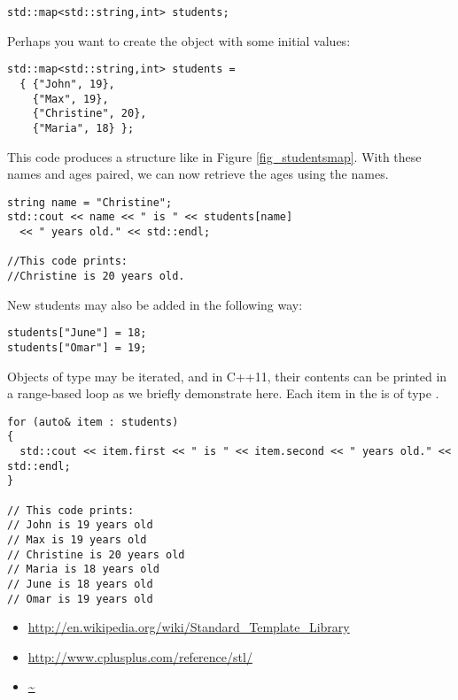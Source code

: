 \begin{lstlisting}
std::map<std::string,int> students;
\end{lstlisting}

Perhaps you want to create the object with some initial values:

\begin{lstlisting}
std::map<std::string,int> students = 
  { {"John", 19}, 
    {"Max", 19}, 
    {"Christine", 20}, 
    {"Maria", 18} };
\end{lstlisting}

This code produces a structure like in Figure \ref{fig_studentsmap}. 
With these names and ages paired, we can now retrieve the ages using the names.


\begin{lstlisting}
string name = "Christine";
std::cout << name << " is " << students[name] 
  << " years old." << std::endl;

//This code prints:
//Christine is 20 years old.
\end{lstlisting}

New students may also be added in the following way:

\begin{lstlisting}
students["June"] = 18;
students["Omar"] = 19;
\end{lstlisting}

Objects of type  may be iterated, and in C++11, their contents can be printed in a range-based  loop as we briefly demonstrate here. 
Each item in the  is of type .

\begin{lstlisting}
for (auto& item : students)
{
  std::cout << item.first << " is " << item.second << " years old." << std::endl;
}

// This code prints:
// John is 19 years old
// Max is 19 years old
// Christine is 20 years old
// Maria is 18 years old
// June is 18 years old
// Omar is 19 years old
\end{lstlisting}








\begin{itemize}
\item \url{http://en.wikipedia.org/wiki/Standard_Template_Library}
\item \url{http://www.cplusplus.com/reference/stl/}
\item \url{~}
\end{itemize}	
